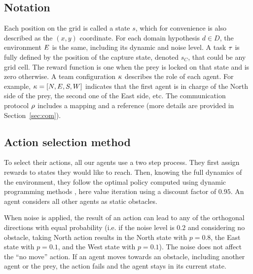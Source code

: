 \subsection{Notation}

Each position on the grid is called a state $s$, which for convenience is also described as the $(x,y)$ coordinate. For each domain hypothesis $d \in D$, the environment $E$ is the same, including its dynamic and noise level. A task $\tau$ is fully defined by the position of the capture state, denoted $s_C$, that could be any grid cell. The reward function is one when the prey is locked on that state and is zero otherwise. A team configuration $\kappa$ describes the role of each agent. For example, $\kappa = [N,E,S,W]$ indicates that the first agent is in charge of the North side of the prey, the second one of the East side, etc. The communication protocol $\rho$ includes a mapping and a reference (more details are provided in Section~\ref{sec:com}).

\subsection{Action selection method}

To select their actions, all our agents use a two step process. They first assign rewards to states they would like to reach. Then, knowing the full dynamics of the environment, they follow the optimal policy computed using dynamic programming methods \cite{sutton1998reinforcement}, here value iteration using a discount factor of $0.95$. An agent considers all other agents as static obstacles. %

When noise is applied, the result of an action can lead to any of the orthogonal directions with equal probability (i.e. if the noise level is $0.2$ and considering no obstacle, taking North action results in the North state with $p=0.8$, the East state with $p=0.1$, and the West state with $p=0.1$). The noise does not affect the ``no move'' action. If an agent moves towards an obstacle, including another agent or the prey, the action fails and the agent stays in its current state.

